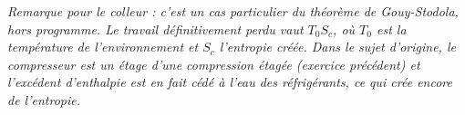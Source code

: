 \begin{correction}
\begin{enumerate}
\begin{enumerate}
		\textit{Remarque pour le colleur : c'est un cas particulier du théorème de Gouy-Stodola, hors programme. Le travail définitivement perdu vaut $T_0S_c$, où $T_0$ est la température de l'environnement et $S_c$ l'entropie créée. Dans le sujet d'origine, le compresseur est un étage d'une compression étagée (exercice précédent) et l'excédent d'enthalpie est en fait cédé à l'eau des réfrigérants, ce qui crée encore de l'entropie.}
	\end{enumerate}

\end{enumerate}

\end{correction}

